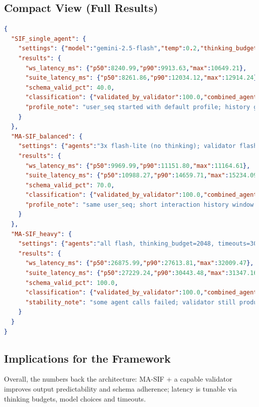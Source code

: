 \documentclass[openany]{book}
\begin{document}
\subsection*{Compact View (Full Results)}
\begin{lstlisting}[language=json,caption={Condensed view of settings and outcomes per configuration.}]
{
  "SIF_single_agent": {
    "settings": {"model":"gemini-2.5-flash","temp":0.2,"thinking_budget":"dynamic","timeout":"api-default"},
    "results": {
      "ws_latency_ms": {"p50":8240.99,"p90":9913.63,"max":10649.21},
      "suite_latency_ms": {"p50":8261.86,"p90":12034.12,"max":12914.24},
      "schema_valid_pct": 40.0,
      "classification": {"validated_by_validator":100.0,"combined_agent_suggestions":0.0,"mock_rule_fallback":0.0},
      "profile_note": "user_seq started with default profile; history grew across events"
    }
  },
  "MA-SIF_balanced": {
    "settings": {"agents":"3x flash-lite (no thinking); validator flash (dynamic thinking, 30s)"},
    "results": {
      "ws_latency_ms": {"p50":9969.99,"p90":11151.80,"max":11164.61},
      "suite_latency_ms": {"p50":10988.27,"p90":14659.71,"max":15234.09},
      "schema_valid_pct": 70.0,
      "classification": {"validated_by_validator":100.0,"combined_agent_suggestions":0.0,"mock_rule_fallback":0.0},
      "profile_note": "same user_seq; short interaction history window provides context"
    }
  },
  "MA-SIF_heavy": {
    "settings": {"agents":"all flash, thinking_budget=2048, timeouts=30s, temps=0.2/0.3"},
    "results": {
      "ws_latency_ms": {"p50":26875.99,"p90":27613.81,"max":32009.47},
      "suite_latency_ms": {"p50":27229.24,"p90":30443.48,"max":31347.16},
      "schema_valid_pct": 100.0,
      "classification": {"validated_by_validator":100.0,"combined_agent_suggestions":0.0,"mock_rule_fallback":0.0},
      "stability_note": "some agent calls failed; validator still produced final valid list"
    }
  }
}
\end{lstlisting}

\subsection*{Implications for the Framework}
Overall, the numbers back the architecture: MA-SIF + a capable validator improves output predictability and schema adherence; latency is tunable via thinking budgets, model choices and timeouts.
\end{document}
